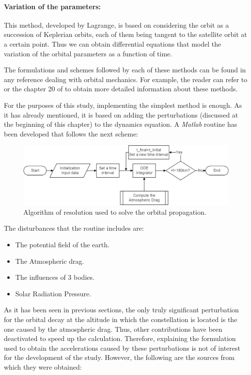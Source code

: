 \paragraph{Variation of the parameters:} This method, developed by Lagrange, is based on considering the orbit as a succession of Keplerian orbits, each of them being tangent to the satellite orbit at a certain point. Thus we can obtain differential equations that model the variation of the orbital parameters as a function of time.

The formulations and schemes followed by each of these methods can be found in any reference dealing with orbital mechanics. For example, the reader can refer to \cite{DavidA.Vallado1998} or the chapter 20 of \cite{Versie} to obtain more detailed information about these methods.

For the purposes of this study, implementing the simplest method is enough. As it has already mentioned, it is based on adding the perturbations (discussed at the beginning of this chapter) to the dynamics equation. A \emph{Matlab} routine has been developed that follows the next scheme:

\begin{figure}[H]
\centering
\includegraphics[scale=.7]{./decay/Diagram.png}
\caption{Algorithm of resolution used to solve the orbital propagation.}
\end{figure}

The disturbances that the routine includes are:
\begin{itemize}
\item The potential field of the earth.
\item The Atmospheric drag.
\item The influences of 3 bodies.
\item Solar Radiation Pressure.
\end{itemize}

As it has been seen in previous sections, the only truly significant perturbation for the orbital decay at the altitude in which the constellation is located is the one caused by the atmospheric drag. Thus, other contributions have been deactivated to speed up the calculation. Therefore, explaining the formulation used to obtain the accelerations caused by these perturbations is not of interest for the development of the study. However, the following are the sources from which they were obtained:

